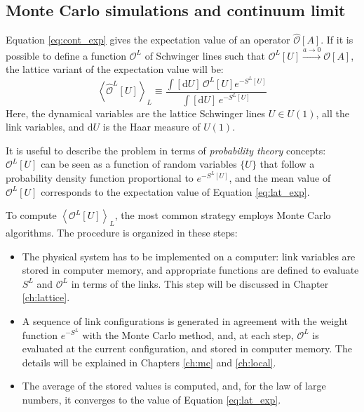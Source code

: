 \subsection*{Monte Carlo simulations and continuum limit}

Equation \eqref{eq:cont_exp} gives the expectation value of an operator $\hat{\mathcal O}[A]$.
If it is possible to define a function $\mathcal O^L$ of Schwinger lines such that $\mathcal O^L[U] \xrightarrow{a\to0} \mathcal O[A]$,
the lattice variant of the expectation value will be:
\begin{equation}\label{eq:lat_exp}
    \left<\hat{\mathcal O}^L[U]\right>_L \equiv \frac{\int[\mathrm dU]\, \mathcal O^L[U] e^{-S^L[U]}}{\int[\mathrm dU]\,e^{-S^L[U]}}
\end{equation}
Here, the dynamical variables are the lattice Schwinger lines $U \in U(1)$, \ie all the link variables, and $\mathrm dU$ is the Haar measure of $U(1)$.

It is useful to describe the problem in terms of \emph{probability theory} concepts:
$\mathcal O^L[U]$ can be seen as a function of random variables $\{U\}$ that follow a probability density function proportional to $e^{-S^L[U]}$,
and the mean value of $\mathcal O^L[U]$ corresponds to the expectation value of Equation \eqref{eq:lat_exp}.

To compute $\left<\mathcal O^L[U]\right>_L$, the most common strategy employs Monte Carlo algorithms.
The procedure is organized in these steps:
\begin{itemize}
    \item The physical system has to be implemented on a computer: link variables are stored in computer memory,
        and appropriate functions are defined to evaluate $S^L$ and $\mathcal O^L$ in terms of the links.
        This step will be discussed in Chapter \ref{ch:lattice}.
    \item A sequence of link configurations is generated in agreement with the weight function $e^{-S^L}$ with the Monte Carlo method, and, at each step,
        $\mathcal O^L$ is evaluated at the current configuration, and stored in computer memory. The details will be explained in Chapters \ref{ch:mc} and \ref{ch:local}.
    \item The average of the stored values is computed, and, for the law of large numbers,
        it converges to the value of Equation \ref{eq:lat_exp}.
\end{itemize}

